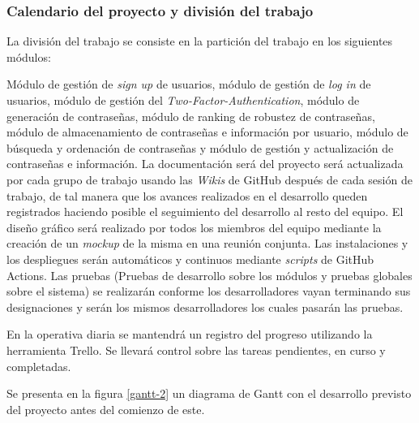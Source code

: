 \documentclass{article}
\begin{document}
\subsubsection{Calendario del proyecto y división del trabajo} \label{GANTT}

La división del trabajo se consiste en la partición del trabajo en los siguientes módulos:

Módulo de gestión de \textit{sign up} de usuarios, módulo de gestión de \textit{log in} de usuarios, módulo de gestión del \textit{Two-Factor-Authentication}, módulo de generación de contraseñas, módulo de ranking de robustez de contraseñas, módulo de almacenamiento de contraseñas e información por usuario, módulo de búsqueda y ordenación de contraseñas y módulo de gestión y actualización de contraseñas e información. La documentación será del proyecto será actualizada por cada grupo de trabajo usando las \textit{Wikis} de GitHub después de cada sesión de trabajo, de tal manera que los avances realizados en el desarrollo queden registrados haciendo posible el seguimiento del desarrollo al resto del equipo. El diseño gráfico será realizado por todos los miembros del equipo mediante la creación de un \textit{mockup} de la misma en una reunión conjunta. Las instalaciones y los despliegues serán automáticos y continuos mediante \textit{scripts} de GitHub Actions. Las pruebas (Pruebas de desarrollo sobre los módulos y pruebas globales sobre el sistema) se realizarán conforme los desarrolladores vayan terminando sus designaciones y serán los mismos desarrolladores los cuales pasarán las pruebas.

En la operativa diaria se mantendrá un registro del progreso utilizando la herramienta Trello. Se llevará control sobre las tareas pendientes, en curso y completadas.

Se presenta en la figura \ref{gantt-2} un diagrama de Gantt con el desarrollo previsto del proyecto antes del comienzo de este.

\pagebreak
\end{document}
